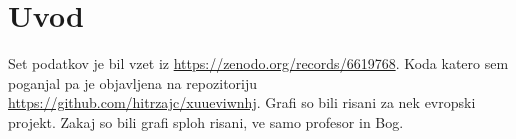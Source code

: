 \section{Uvod}
Set podatkov je bil vzet iz \url{https://zenodo.org/records/6619768}. Koda katero
sem poganjal pa je objavljena na repozitoriju \url{https://github.com/hitrzajc/xuueviwnhj}. Grafi so bili risani za
nek evropski projekt. Zakaj so bili grafi sploh risani, ve samo profesor in Bog.